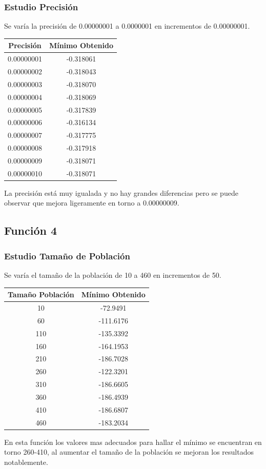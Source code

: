 \documentclass[12pt]{article}
\begin{document}
\subsubsection*{Estudio Precisión}
	Se varía la precisión de 0.00000001 a 0.0000001 en incrementos de 0.00000001.
\begin{table}[H]
\begin{center}
\begin{tabular}{|cc|} \hline
Precisión & Mínimo Obtenido \\  \hline
0.00000001 & -0.318061 \\ 
0.00000002 & -0.318043 \\ 
0.00000003 & -0.318070 \\
0.00000004 & -0.318069 \\
0.00000005 & -0.317839 \\
0.00000006 & -0.316134 \\
0.00000007 & -0.317775 \\
0.00000008 & -0.317918 \\ 
0.00000009 & -0.318071 \\
0.00000010 & -0.318071 \\  \hline
\end{tabular}
\end{center}
\end{table}
	La precisión está muy igualada y no hay grandes diferencias pero se puede observar que mejora ligeramente en torno a 0.00000009.

\subsection{Función 4}
\subsubsection*{Estudio Tamaño de Población}
	Se varía el tamaño de la población de 10 a 460 en incrementos de 50.
\begin{table}[H]
\begin{center}
\begin{tabular}{|cc|} \hline
Tamaño Población & Mínimo Obtenido \\  \hline
10  & -72.9491 \\ 
60  & -111.6176 \\ 
110 & -135.3392 \\
160 & -164.1953 \\
210 & -186.7028 \\
260 & -122.3201 \\
310 & -186.6605 \\
360 & -186.4939 \\ 
410 & -186.6807 \\
460 & -183.2034 \\  \hline
\end{tabular}
\end{center}
\end{table}
	En esta función los valores mas adecuados para hallar el mínimo se encuentran en torno 260-410, al aumentar el tamaño de la población se mejoran los resultados notablemente. 
\end{document}

